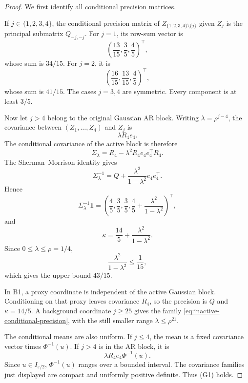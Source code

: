 \begin{proof}
We first identify all conditional precision matrices.

If \(j\in\{1,2,3,4\}\), the conditional precision matrix of
\(Z_{\{1,2,3,4\}\setminus\{j\}}\) given \(Z_j\) is the principal
submatrix \(Q_{-j,-j}\). For \(j=1\), its row-sum vector is
\[
 \left(\frac{13}{15},\frac35,\frac45\right)^\top,
\]
whose sum is \(34/15\). For \(j=2\), it is
\[
 \left(\frac{16}{15},\frac{13}{15},\frac45\right)^\top,
\]
whose sum is \(41/15\). The cases \(j=3,4\) are symmetric.
Every component is at least \(3/5\).

Now let \(j>4\) belong to the original Gaussian AR block.
Writing \(\lambda=\rho^{j-4}\), the covariance between
\((Z_1,\ldots,Z_4)\) and \(Z_j\) is
\[
 \lambda R_4e_4.
\]
The conditional covariance of the active block is therefore
\[
 \Sigma_\lambda
 =
 R_4-\lambda^2R_4e_4e_4^\top R_4.
\]
The Sherman--Morrison identity gives
\begin{equation}
 \Sigma_\lambda^{-1}
 =
 Q+\frac{\lambda^2}{1-\lambda^2}e_4e_4^\top.
 \label{eq:inactive-conditional-precision}
\end{equation}
Hence
\[
 \Sigma_\lambda^{-1}\mathbf 1
 =
 \left(
  \frac45,\frac35,\frac35,
  \frac45+\frac{\lambda^2}{1-\lambda^2}
 \right)^\top,
\]
and
\[
 \kappa
 =
 \frac{14}{5}+\frac{\lambda^2}{1-\lambda^2}.
\]
Since \(0\le\lambda\le\rho=1/4\),
\[
 \frac{\lambda^2}{1-\lambda^2}\le\frac1{15},
\]
which gives the upper bound \(43/15\).

In B1, a proxy coordinate is independent of the active Gaussian
block. Conditioning on that proxy leaves covariance \(R_4\),
so the precision is \(Q\) and \(\kappa=14/5\). A background
coordinate \(j\ge25\) gives the family
\eqref{eq:inactive-conditional-precision}, with the still
smaller range \(\lambda\le\rho^{21}\).

The conditional means are also uniform. If \(j\le4\), the mean
is a fixed covariance vector times
\(\Phi^{-1}(u)\). If \(j>4\) is in the AR block, it is
\[
 \lambda R_4e_4\Phi^{-1}(u).
\]
Since \(u\in I_{\varepsilon/2}\),
\(\Phi^{-1}(u)\) ranges over a bounded interval. The covariance
families just displayed are compact and uniformly positive
definite. Thus (G1) holds.


\end{proof}
